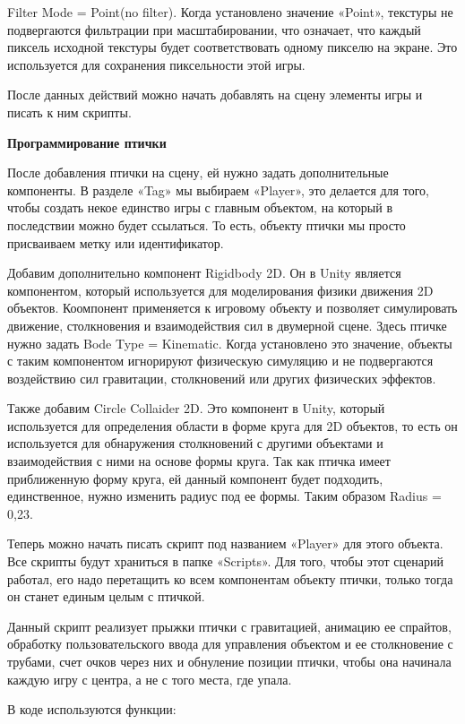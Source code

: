 \documentclass[14pt, oneside]{altsu-report}
\begin{document}
Filter Mode = Point(no filter). Когда установлено значение «Point», текстуры не подвергаются фильтрации при масштабировании, что означает, что каждый пиксель исходной текстуры будет соответствовать одному пикселю на экране. Это используется для сохранения пиксельности этой игры.

После данных действий можно начать добавлять на сцену элементы игры и писать к ним скрипты.

\textbf{Программирование птички}

После добавления птички на сцену, ей нужно задать дополнительные компоненты. В разделе «Tag» мы выбираем «Player», это делается для того, чтобы создать некое единство игры с главным объектом, на который в последствии можно будет ссылаться. То есть, объекту птички мы просто присваиваем метку или идентификатор.

Добавим дополнительно компонент Rigidbody 2D. Он в Unity является компонентом, который используется для моделирования физики движения 2D объектов. Коомпонент применяется к игровому объекту и позволяет симулировать движение, столкновения и взаимодействия сил в двумерной сцене. Здесь птичке нужно задать Bode Type = Kinematic. Когда установлено это значение, объекты с таким компонентом игнорируют физическую симуляцию и не подвергаются воздействию сил гравитации, столкновений или других физических эффектов.

Также добавим Circle Collaider 2D. Это компонент в Unity, который используется для определения области в форме круга для 2D объектов, то есть он используется для обнаружения столкновений с другими объектами и взаимодействия с ними на основе формы круга. Так как птичка имеет приближенную форму круга, ей данный компонент будет подходить, единственное, нужно изменить радиус под ее формы. Таким образом Radius = 0,23.

Теперь можно начать писать скрипт под названием «Player» для этого объекта. Все скрипты будут храниться в папке «Scripts». Для того, чтобы этот сценарий работал, его надо перетащить ко всем компонентам объекту птички, только тогда он станет единым целым с птичкой. 

Данный скрипт реализует прыжки птички с гравитацией, анимацию ее спрайтов, обработку пользовательского ввода для управления объектом и ее столкновение с трубами, счет очков через них и обнуление позиции птички, чтобы она начинала каждую игру с центра, а не с того места, где упала.

В коде используются функции:
\end{document}
